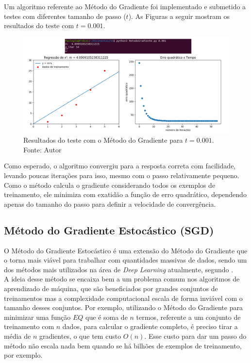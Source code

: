 \documentclass[a4paper,12pt]{article}
\begin{document}
Um algoritmo referente ao Método do Gradiente foi implementado e submetido a testes com diferentes tamanho de passo ($t$). As Figuras a seguir mostram os resultados do teste com $t = 0.001$.

\begin{figure}[H]
\centering 
\includegraphics[scale=0.5]{Figuras/GD.png}
\caption{Resultados do teste com o Método do Gradiente para $t = 0.001$. Fonte: Autor}
\end{figure} 

Como esperado, o algoritmo convergiu para a resposta correta com facilidade, levando poucas iterações para isso, mesmo com o passo relativamente pequeno. Como o método calcula o gradiente considerando todos os exemplos de treinamento, ele minimiza com exatidão a função de erro quadrático, dependendo apenas do tamanho do passo para definir a velocidade de convergência.


\subsection{Método do Gradiente Estocástico (SGD)}

O Método do Gradiente Estocástico é uma extensão do Método do Gradiente que o torna mais viável para trabalhar com quantidades massivas de dados, sendo um dos métodos mais utilizados na área de \textit{Deep Learning} atualmente, segundo \cite{livroGoodFellow}.\\

A ideia desse método se encaixa bem a um problema comum nos algoritmos de aprendizado de máquina, que são beneficiados por grandes conjuntos de treinamentos mas a complexidade computacional escala de forma inviável com o tamanho desses conjuntos. Por exemplo, utilizando o Método do Gradiente para minimizar uma função $EQ$ que é soma de $n$ termos, referente a um conjunto de treinamento com $n$ dados, para calcular o gradiente completo, é preciso tirar a média de $n$ gradientes, o que tem custo $O(n)$. Esse custo para dar um passo do método não escala nada bem quando se há bilhões de exemplos de treinamento, por exemplo.\\
\end{document}
